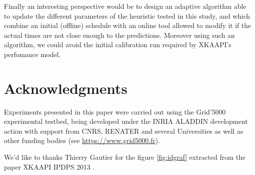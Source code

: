 \documentclass[10pt, conference, compsocconf,pdftex,dvipsnames]{IEEEtran}
\newcommand{\mytodo}[1]{\todo[inline]{#1}}
\begin{document}
Finally an interesting perspective would be to design an adaptive algorithm
able to update the different parameters of the heuristic tested in this study,
and which combine an initial (offline) schedule with an online tool allowed to
modify it if the actual times are not close enough to the predictions. Moreover
using such an algorithm, we could avoid the initial calibration run required
by XKAAPI's perfomance model.

\section*{Acknowledgments}

Experiments presented in this paper were carried out using the Grid'5000
experimental testbed, being developed under the INRIA ALADDIN development 
action with support from CNRS, RENATER and several Universities as well as
other funding bodies (see \url{https://www.grid5000.fr}).


We'd like to thanks Thierry Gautier for the figure \ref{fig:idgraf} extracted
from the paper XKAAPI IPDPS 2013 \cite{gautierxkaapi}.






\mytodo{Remove the todo list}
\listoftodos



\end{document}
